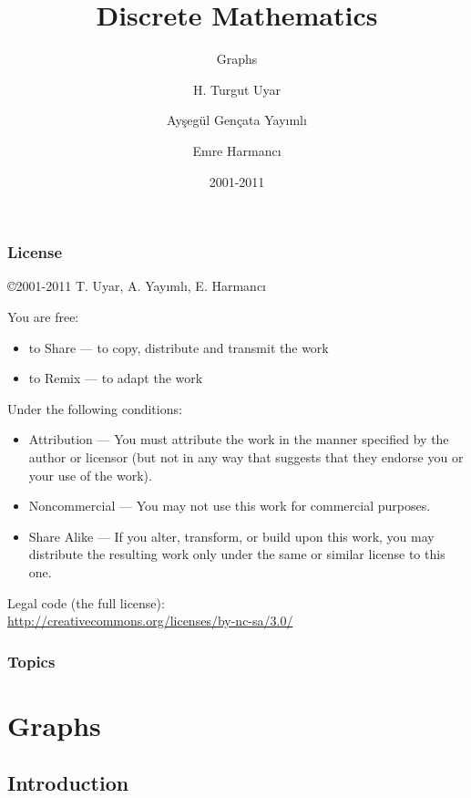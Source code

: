 \documentclass[dvipsnames]{beamer}
\title{Discrete Mathematics}
\subtitle{Graphs}
\author{H. Turgut Uyar \and Ayşegül Gençata Yayımlı \and Emre Harmancı}
\date{2001-2011}
\begin{document}
\begin{frame}
  \titlepage
\end{frame}

\begin{frame}
  \frametitle{License}

  \hfill
  \copyright 2001-2011 T. Uyar, A. Yayımlı, E. Harmancı

  \vfill
  \begin{tiny}
    You are free:
    \begin{itemize}
      \item to Share — to copy, distribute and transmit the work
      \item to Remix — to adapt the work
    \end{itemize}

    Under the following conditions:
    \begin{itemize}
      \item Attribution — You must attribute the work in the manner specified by
        the author or licensor (but not in any way that suggests that they
        endorse you or your use of the work).

      \item Noncommercial — You may not use this work for commercial purposes.

      \item Share Alike — If you alter, transform, or build upon this work, you
        may distribute the resulting work only under the same or similar license
        to this one.
    \end{itemize}
  \end{tiny}

  \vfill
  Legal code (the full license):\\
  \url{http://creativecommons.org/licenses/by-nc-sa/3.0/}
\end{frame}

\begin{frame}
  \frametitle{Topics}
  \tableofcontents
\end{frame}

\section{Graphs}

\subsection{Introduction}
\end{document}
